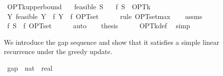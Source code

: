 \begin{isabellebody}
%
\endisatagproof
{\isafoldproof}%
%
\isadelimproof
\isanewline
%
\endisadelimproof
\isanewline
{}\isamarkupfalse%
\ OPT{\isacharunderscore}{\kern0pt}k{\isacharunderscore}{\kern0pt}upper{\isacharunderscore}{\kern0pt}bound{\isacharcolon}{\kern0pt}\isanewline
\ \ \ {\isachardoublequoteopen}feasible\ S{\isachardoublequoteclose}\isanewline
\ \ \ {\isachardoublequoteopen}f\ S\ {\isasymle}\ OPT{\isacharunderscore}{\kern0pt}k{\isachardoublequoteclose}\isanewline
%
\isadelimproof
%
\endisadelimproof
%
\isatagproof
{}\isamarkupfalse%
\ {\isacharminus}{\kern0pt}\isanewline
\ \ \isamarkupfalse%
\ {\isachardoublequoteopen}{\isasymforall}Y{\isachardot}{\kern0pt}\ feasible\ Y\ {\isasymlongrightarrow}\ f\ Y\ {\isasymle}\ f\ OPT{\isacharunderscore}{\kern0pt}set{\isachardoublequoteclose}\isanewline
\ \ \ \ \isamarkupfalse%
\ {\isacharparenleft}{\kern0pt}rule\ OPT{\isacharunderscore}{\kern0pt}set{\isacharunderscore}{\kern0pt}max{\isacharparenright}{\kern0pt}\isanewline
\ \ \isamarkupfalse%
\ assms\ \isamarkupfalse%
\ {\isachardoublequoteopen}f\ S\ {\isasymle}\ f\ OPT{\isacharunderscore}{\kern0pt}set{\isachardoublequoteclose}\isanewline
\ \ \ \ \isamarkupfalse%
\ auto\isanewline
\ \ \isamarkupfalse%
\ {\isacharquery}{\kern0pt}thesis\isanewline
\ \ \ \ \isamarkupfalse%
\ OPT{\isacharunderscore}{\kern0pt}k{\isacharunderscore}{\kern0pt}def\ \isamarkupfalse%
\ simp\isanewline
{}\isamarkupfalse%
%
\endisatagproof
{\isafoldproof}%
%
\isadelimproof
%
\endisadelimproof
%
\isadelimdocument
%
\endisadelimdocument
%
\isatagdocument
%
\isamarkuptrue%
%
\endisatagdocument
{\isafolddocument}%
%
\isadelimdocument
%
\endisadelimdocument
%
\begin{isamarkuptext}%
We introduce the gap sequence  and
  show that it satisfies a simple linear recurrence under the greedy update.%
\end{isamarkuptext}\isamarkuptrue%
\isamarkupfalse%
\ gap\ {\isacharcolon}{\kern0pt}{\isacharcolon}{\kern0pt}\ {\isachardoublequoteopen}nat\ {\isasymRightarrow}\ real{\isachardoublequoteclose}\ \isanewline

\end{isabellebody}
